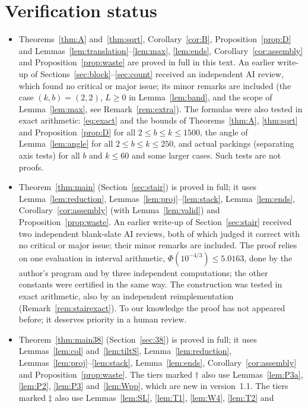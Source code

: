 \documentclass[11pt]{amsart}
\theoremstyle{definition}
\theoremstyle{remark}
\numberwithin{equation}{section}
\begin{document}
\section*{Verification status}
\begin{itemize}
\item Theorems~\ref{thm:A} and~\ref{thm:sqrt}, Corollary~\ref{cor:B}, Proposition~\ref{prop:D} and
Lemmas~\ref{lem:translation}--\ref{lem:max}, \ref{lem:ends}, Corollary~\ref{cor:assembly} and
Proposition~\ref{prop:waste} are proved in full in this text. An earlier write-up of Sections~\ref{sec:block}--\ref{sec:count}
received an independent AI review, which found no critical or major issue; its minor remarks are included (the case
$(k,b)=(2,2)$, $L\ge0$ in Lemma~\ref{lem:band}, and the scope of Lemma~\ref{lem:max}, see Remark~\ref{rem:extra}). The
formulas were also tested in exact arithmetic: \eqref{eq:exact} and the bounds of Theorems~\ref{thm:A}, \ref{thm:sqrt}
and Proposition~\ref{prop:D} for all $2\le b\le k\le1500$, the angle of Lemma~\ref{lem:angle} for all $2\le b\le k\le250$,
and actual packings (separating axis tests) for all $b$ and $k\le60$ and some larger cases. Such tests are not proofs.
\item Theorem~\ref{thm:main} (Section~\ref{sec:stair}) is proved in full; it uses Lemma~\ref{lem:reduction},
Lemmas~\ref{lem:proj}--\ref{lem:stack}, Lemma~\ref{lem:ends}, Corollary~\ref{cor:assembly} (with
Lemma~\ref{lem:valid}) and Proposition~\ref{prop:waste}. An earlier write-up of Section~\ref{sec:stair} received two
independent blank-slate AI reviews, both of which judged it correct with no critical or major issue; their minor
remarks are included. The proof relies on one evaluation in interval arithmetic, $\Phi(10^{-4/3})\le5.0163$, done by the
author's program and by three independent computations; the other constants were certified in the same way. The
construction was tested in exact arithmetic, also by an independent reimplementation (Remark~\ref{rem:stairexact}).
To our knowledge the proof has not appeared before; it deserves priority in a human review.
\item Theorem~\ref{thm:main38} (Section~\ref{sec:38}) is proved in full; it uses Lemmas~\ref{lem:col}
and~\ref{lem:tiltS}, Lemma~\ref{lem:reduction}, Lemmas~\ref{lem:proj}--\ref{lem:stack}, Lemma~\ref{lem:ends},
Corollary~\ref{cor:assembly} and Proposition~\ref{prop:waste}.
The tiers marked $\dagger$ also use Lemmas~\ref{lem:P3a}, \ref{lem:P2}, \ref{lem:P3} and~\ref{lem:Wpp}, which are new in
version~1.1.
The tiers marked $\ddagger$ also use Lemmas~\ref{lem:SL}, \ref{lem:T1}, \ref{lem:W4}, \ref{lem:T2} and

\end{itemize}
\end{document}
